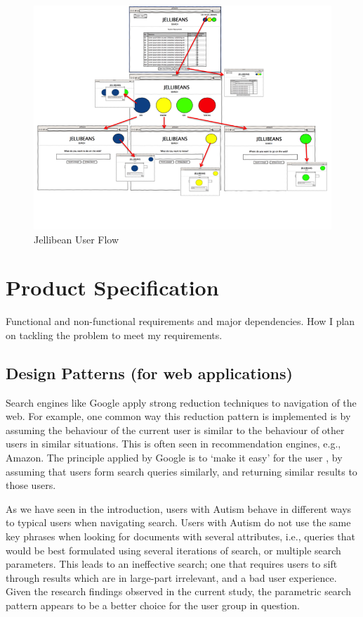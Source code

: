 \documentclass[a4paper, 11pt]{article}
\begin{document}
\begin{figure}[H]
\begin{center}
\includegraphics[scale=0.7]{JellibeanFlow.png}
\end{center}
\caption{Jellibean User Flow}
\label{JBeanUserFlow}
\end{figure}


\section{Product Specification}
Functional and non-functional requirements and major dependencies.
How I plan on tackling the problem to meet my requirements.

\subsection{Design Patterns (for web applications)}

Search engines like Google apply strong reduction techniques to navigation of the web. For example, one common way this reduction pattern is implemented is by assuming the behaviour of the current user is similar to the behaviour of other users in similar situations. This is often seen in recommendation engines, e.g., Amazon. The principle applied by Google is to ‘make it easy’ for the user \cite{googleTerms}, by assuming that users form search queries similarly, and returning similar results to those users.

As we have seen in the introduction, users with Autism behave in different ways to typical users when navigating search. Users with Autism do not use the same key phrases when looking for documents with several attributes, i.e., queries that would be best formulated using several iterations of search, or multiple search parameters. This leads to an ineffective search; one that requires users to sift through results which are in large-part irrelevant, and a bad user experience. Given the research findings observed in the current study, the parametric search pattern appears to be a better choice for the user group in question.  
\end{document}
